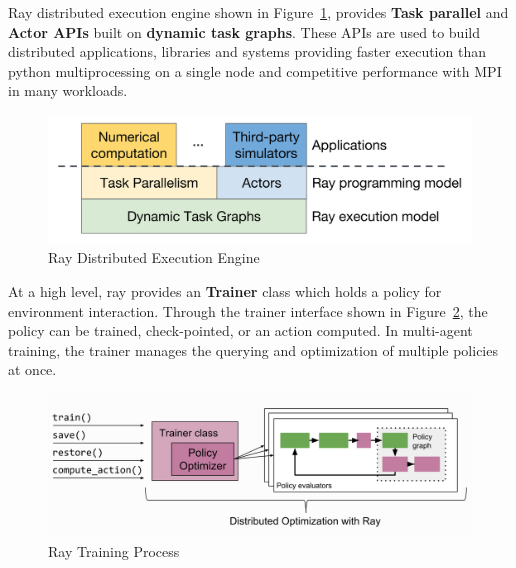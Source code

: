 Ray distributed execution engine shown in Figure~\ref{fig:ray_engine}, provides \textbf{Task parallel} and \textbf{Actor APIs} built on \textbf{dynamic task graphs}. These APIs are used to build distributed applications, libraries and systems providing faster execution than python multiprocessing on a single node and competitive performance with MPI in many workloads.
\begin{figure}[!htb]
	\centering
	\includegraphics[width=\linewidth]{figures/architecture/ray_engine.png}
	\caption[Ray Distributed Execution Engine]{Ray Distributed Execution Engine\footnotemark}
	\label{fig:ray_engine}
\end{figure}


At a high level, ray provides an \textbf{\colorbox{gray!20}{Trainer}} class which holds a policy for environment interaction. Through the trainer interface shown in Figure~\ref{fig:ray_trainer}, the policy can be trained, check-pointed, or an action computed. In multi-agent training, the trainer manages the querying and optimization of multiple policies at once. 
\begin{figure}[!htb]
	\centering
	\includegraphics[width=\textwidth]{figures/architecture/ray_trainer.png}
	\caption[Ray Training Process]{Ray Training Process\footnotemark}
	\label{fig:ray_trainer}
\end{figure}

